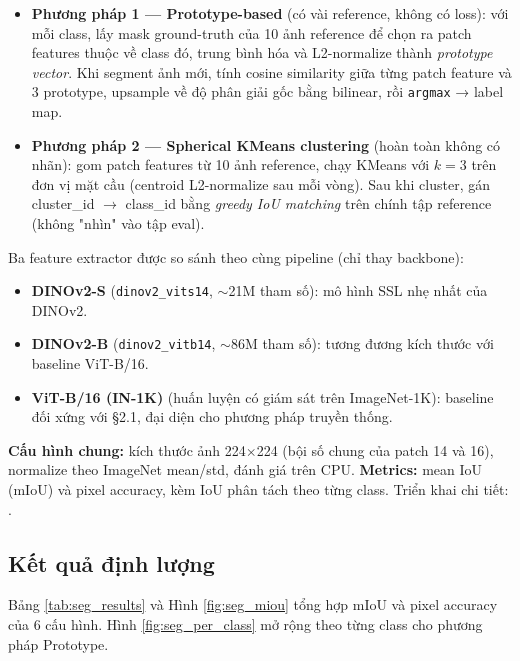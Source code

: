 \begin{itemize}
    \item \textbf{Phương pháp 1 — Prototype-based} (có vài reference, không có loss): với mỗi class, lấy mask ground-truth của 10 ảnh reference để chọn ra patch features thuộc về class đó, trung bình hóa và L2-normalize thành \textit{prototype vector}. Khi segment ảnh mới, tính cosine similarity giữa từng patch feature và 3 prototype, upsample về độ phân giải gốc bằng bilinear, rồi \texttt{argmax} → label map.
    \item \textbf{Phương pháp 2 — Spherical KMeans clustering} (hoàn toàn không có nhãn): gom patch features từ 10 ảnh reference, chạy KMeans với $k=3$ trên đơn vị mặt cầu (centroid L2-normalize sau mỗi vòng). Sau khi cluster, gán cluster\_id $\rightarrow$ class\_id bằng \textit{greedy IoU matching} trên chính tập reference (không "nhìn" vào tập eval).
\end{itemize}

Ba feature extractor được so sánh theo cùng pipeline (chỉ thay backbone):
\begin{itemize}
    \item \textbf{DINOv2-S} (\texttt{dinov2\_vits14}, $\sim$21M tham số): mô hình SSL nhẹ nhất của DINOv2.
    \item \textbf{DINOv2-B} (\texttt{dinov2\_vitb14}, $\sim$86M tham số): tương đương kích thước với baseline ViT-B/16.
    \item \textbf{ViT-B/16 (IN-1K)} (huấn luyện có giám sát trên ImageNet-1K): baseline đối xứng với §2.1, đại diện cho phương pháp truyền thống.
\end{itemize}

\textbf{Cấu hình chung:} kích thước ảnh 224$\times$224 (bội số chung của patch 14 và 16), normalize theo ImageNet mean/std, đánh giá trên CPU. \textbf{Metrics:} mean IoU (mIoU) và pixel accuracy, kèm IoU phân tách theo từng class. Triển khai chi tiết: .

\subsection{Kết quả định lượng}
Bảng \ref{tab:seg_results} và Hình \ref{fig:seg_miou} tổng hợp mIoU và pixel accuracy của 6 cấu hình. Hình \ref{fig:seg_per_class} mở rộng theo từng class cho phương pháp Prototype.

